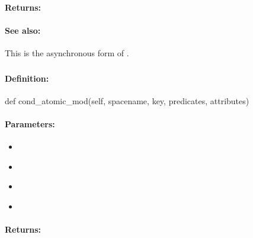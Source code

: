 \paragraph{Returns:}


\paragraph{See also:}  This is the asynchronous form of .

\pagebreak
\subsubsection{}
\label{api:python:cond_atomic_mod}


\paragraph{Definition:}
\begin{pythoncode}
def cond_atomic_mod(self, spacename, key, predicates, attributes)
\end{pythoncode}

\paragraph{Parameters:}
\begin{itemize}[noitemsep]
\item {}\\

\item {}\\

\item {}\\

\item {}\\

\end{itemize}

\paragraph{Returns:}


